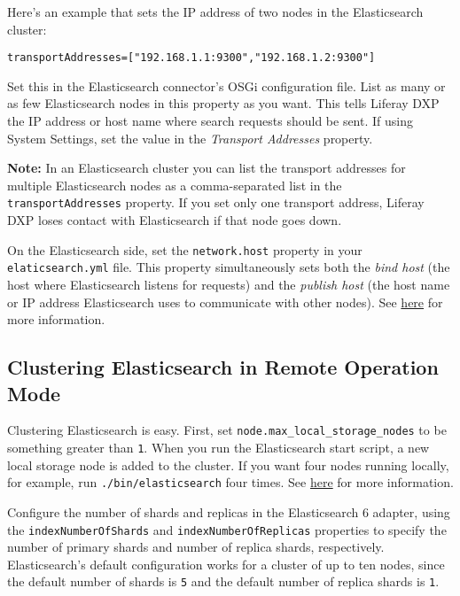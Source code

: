 Here's an example that sets the IP address of two nodes in the
Elasticsearch cluster:

\begin{verbatim}
transportAddresses=["192.168.1.1:9300","192.168.1.2:9300"]
\end{verbatim}

Set this in the Elasticsearch connector's OSGi configuration file. List
as many or as few Elasticsearch nodes in this property as you want. This
tells Liferay DXP the IP address or host name where search requests
should be sent. If using System Settings, set the value in the
\emph{Transport Addresses} property.

\noindent\hrulefill

\textbf{Note:} In an Elasticsearch cluster you can list the transport
addresses for multiple Elasticsearch nodes as a comma-separated list in
the \texttt{transportAddresses} property. If you set only one transport
address, Liferay DXP loses contact with Elasticsearch if that node goes
down.

\noindent\hrulefill

On the Elasticsearch side, set the \texttt{network.host} property in
your \texttt{elaticsearch.yml} file. This property simultaneously sets
both the \emph{bind host} (the host where Elasticsearch listens for
requests) and the \emph{publish host} (the host name or IP address
Elasticsearch uses to communicate with other nodes). See
\href{https://www.elastic.co/guide/en/elasticsearch/reference/6.5/modules-network.html}{here}
for more information.

\subsection{Clustering Elasticsearch in Remote Operation
Mode}\label{clustering-elasticsearch-in-remote-operation-mode}

Clustering Elasticsearch is easy. First, set
\texttt{node.max\_local\_storage\_nodes} to be something greater than
\texttt{1}. When you run the Elasticsearch start script, a new local
storage node is added to the cluster. If you want four nodes running
locally, for example, run \texttt{./bin/elasticsearch} four times. See
\href{https://www.elastic.co/guide/en/elasticsearch/reference/6.5/modules-node.html\#max-local-storage-nodes}{here}
for more information.

Configure the number of shards and replicas in the Elasticsearch 6
adapter, using the \texttt{indexNumberOfShards} and
\texttt{indexNumberOfReplicas} properties to specify the number of
primary shards and number of replica shards, respectively.
Elasticsearch's default configuration works for a cluster of up to ten
nodes, since the default number of shards is \texttt{5} and the default
number of replica shards is \texttt{1}.

